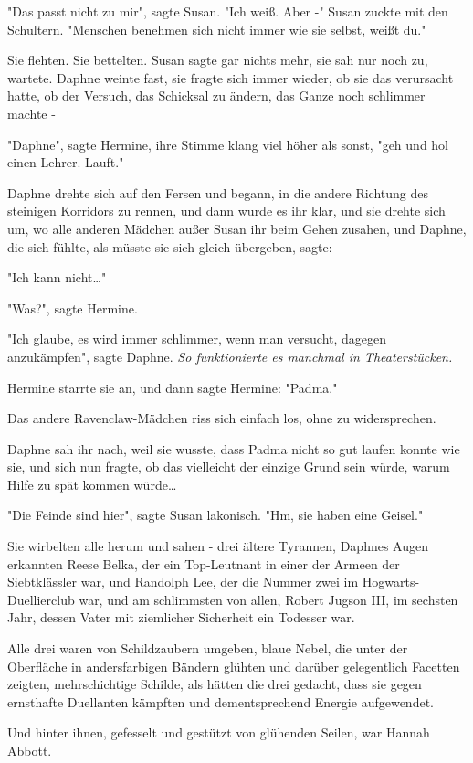 {"Das passt nicht zu mir", sagte Susan. "Ich weiß. Aber -" Susan zuckte mit den Schultern. "Menschen benehmen sich nicht immer wie sie selbst, weißt du."

Sie flehten. Sie bettelten. Susan sagte gar nichts mehr, sie sah nur noch zu, wartete. Daphne weinte fast, sie fragte sich immer wieder, ob sie das verursacht hatte, ob der Versuch, das Schicksal zu ändern, das Ganze noch schlimmer machte -

"Daphne", sagte Hermine, ihre Stimme klang viel höher als sonst, "geh und hol einen Lehrer. Lauft."

Daphne drehte sich auf den Fersen und begann, in die andere Richtung des steinigen Korridors zu rennen, und dann wurde es ihr klar, und sie drehte sich um, wo alle anderen Mädchen außer Susan ihr beim Gehen zusahen, und Daphne, die sich fühlte, als müsste sie sich gleich übergeben, sagte:

"Ich kann nicht…"

"Was?", sagte Hermine.

"Ich glaube, es wird immer schlimmer, wenn man versucht, dagegen anzukämpfen", sagte Daphne. \emph{So funktionierte es manchmal in Theaterstücken.}

Hermine starrte sie an, und dann sagte Hermine: "Padma."

Das andere Ravenclaw-Mädchen riss sich einfach los, ohne zu widersprechen.

Daphne sah ihr nach, weil sie wusste, dass Padma nicht so gut laufen konnte wie sie, und sich nun fragte, ob das vielleicht der einzige Grund sein würde, warum Hilfe zu spät kommen würde…

"Die Feinde sind hier", sagte Susan lakonisch. "Hm, sie haben eine Geisel."

Sie wirbelten alle herum und sahen - drei ältere Tyrannen, Daphnes Augen erkannten Reese Belka, der ein Top-Leutnant in einer der Armeen der Siebtklässler war, und Randolph Lee, der die Nummer zwei im Hogwarts-Duellierclub war, und am schlimmsten von allen, Robert Jugson III, im sechsten Jahr, dessen Vater mit ziemlicher Sicherheit ein Todesser war.

Alle drei waren von Schildzaubern umgeben, blaue Nebel, die unter der Oberfläche in andersfarbigen Bändern glühten und darüber gelegentlich Facetten zeigten, mehrschichtige Schilde, als hätten die drei gedacht, dass sie gegen ernsthafte Duellanten kämpften und dementsprechend Energie aufgewendet.

Und hinter ihnen, gefesselt und gestützt von glühenden Seilen, war Hannah Abbott.

}
